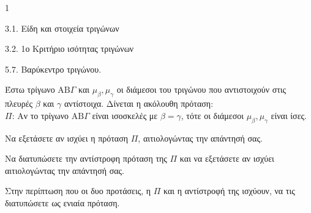 \begin{ylh}{1}
    \item 3.1. Είδη και στοιχεία τριγώνων
    \item 3.2. 1ο Κριτήριο ισότητας τριγώνων
    \item 5.7. Βαρύκεντρο τριγώνου.
\end{ylh}
Έστω τρίγωνο $\mathrm{A}\mathrm{B}\Gamma$ και $\mu_\beta, \mu_\gamma$ οι διάμεσοι του τριγώνου που αντιστοιχούν στις πλευρές $\beta$ και $\gamma$ αντίστοιχα. Δίνεται η ακόλουθη πρόταση:\\[0.2cm]
$\Pi$: Αν το τρίγωνο $\mathrm{A}\mathrm{B}\Gamma$ είναι ισοσκελές με $\beta = \gamma$, τότε οι διάμεσοι $\mu_\beta, \mu_\gamma$ είναι ίσες.
\begin{alist}
    \item Να εξετάσετε αν ισχύει η πρόταση $\Pi$, αιτιολογώντας την απάντησή σας. 
    \item Να διατυπώσετε την αντίστροφη πρόταση της $\Pi$ και να εξετάσετε αν ισχύει αιτιολογώντας την απάντησή σας. 
    \item Στην περίπτωση που οι δυο προτάσεις, η $\Pi$ και η αντίστροφή της ισχύουν, να τις διατυπώσετε ως ενιαία πρόταση. 
\end{alist}
